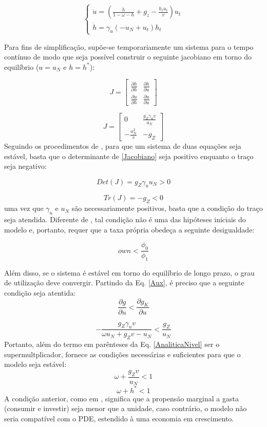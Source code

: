 $$
\begin{cases}
\dot u = \left(\frac{\dot h}{1 - \omega - h} + g_z - \frac{h_t u_t}{v}\right) u_t\\
\dot h = \gamma_{u} \left(- u_N + u_t\right) h_t
\end{cases}
$$

Para fins de simplificação, supõe-se temporariamente um sistema para o tempo contínuo de modo que seja possível construir o seguinte jacobiano em torno do equilíbrio ($u = u_N$ e $h = h^*$):

$$
J = 
\left[\begin{matrix}
\frac{\partial \dot h}{\partial h} & \frac{\partial \dot h}{\partial u}\\
\frac{\partial \dot u}{\partial h} & \frac{\partial \dot u}{\partial u}
\end{matrix}\right]
$$

\begin{equation}
J = 
\label{Jacobiano}
\left[\begin{matrix}0 & \frac{g_Z \gamma_{u} v}{u_N}\\- \frac{u_N^{2}}{v} & - g_Z\end{matrix}\right]
\end{equation}
Seguindo os procedimentos de \textcite{gandolfo_economic_2010}, para que um sistema de duas equações seja estável, basta que o determinante de \ref{Jacobiano} seja positivo enquanto o traço seja negativo:

$$
Det(J) = g_Z \gamma_{u} u_N > 0
$$

$$
Tr(J) = -g_Z < 0
$$
uma vez que $\gamma_u$ e $u_N$ são necessariamente positivos, basta que a condição do traço seja atendida. Diferente de \textcite{freitas_growth_2015}, tal condição não é uma das hipóteses iniciais do modelo e, portanto, requer que a taxa própria obedeça a seguinte desigualdade:

\begin{equation}
own < \frac{\phi_0}{\phi_1}
\end{equation}

Além disso, se o sistema é estável em torno do equilíbrio de longo prazo, o grau de utilização deve convergir. Partindo da Eq. \ref{Aux}, é preciso que a seguinte condição seja atentida:
$$
\frac{\partial g}{\partial u} < \frac{\partial g_K}{\partial u}
$$

$$
- \frac{g_Z \gamma_{u} v}{\omega u_N + g_Z v - u_N} < \frac{g_Z}{u_N}
$$
Portanto, além do termo em parênteses da Eq. \ref{AnaliticaNivel} ser o supermultplicador, fornece as condições necessárias e suficientes para que o modelo seja estável: 
$$
\omega + \frac{g_Z v}{u_N} < 1
$$
\begin{equation}
\omega + h^* < 1
\end{equation}
A condição anterior, como em \textcite{freitas_growth_2015}, significa que a propensão marginal a gasta (consumir e investir) seja menor que a unidade, caso contrário, 
o modelo não seria compatível com o PDE, estendido à uma economia em crescimento.


